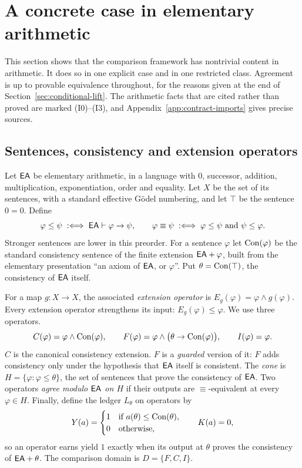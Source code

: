 \section{A concrete case in elementary arithmetic}\label{sec:arithmetic-instance}

This section shows that the comparison framework has nontrivial content in arithmetic. It does so in one explicit case and in one restricted class. Agreement is up to provable equivalence throughout, for the reasons given at the end of Section~\ref{sec:conditional-lift}. The arithmetic facts that are cited rather than proved are marked (I0)--(I3), and Appendix~\ref{app:contract-imports} gives precise sources.

\subsection{Sentences, consistency and extension operators}

Let $\mathsf{EA}$ be elementary arithmetic, in a language with $0$, successor, addition, multiplication, exponentiation, order and equality. Let $X$ be the set of its sentences, with a standard effective G\"odel numbering, and let $\top$ be the sentence $0=0$. Define
\[
\varphi\le\psi \;:\Longleftrightarrow\; \mathsf{EA}\vdash\varphi\to\psi,
\qquad
\varphi\equiv\psi \;:\Longleftrightarrow\; \varphi\le\psi\text{ and }\psi\le\varphi .
\]
Stronger sentences are lower in this preorder. For a sentence $\varphi$ let $\mathrm{Con}(\varphi)$ be the standard consistency sentence of the finite extension $\mathsf{EA}+\varphi$, built from the elementary presentation ``an axiom of $\mathsf{EA}$, or $\varphi$''. Put $\theta=\mathrm{Con}(\top)$, the consistency of $\mathsf{EA}$ itself.

For a map $g\colon X\to X$, the associated \emph{extension operator} is $E_g(\varphi)=\varphi\wedge g(\varphi)$. Every extension operator strengthens its input: $E_g(\varphi)\le\varphi$. We use three operators.
\[
C(\varphi)=\varphi\wedge\mathrm{Con}(\varphi),\qquad
F(\varphi)=\varphi\wedge\bigl(\theta\to\mathrm{Con}(\varphi)\bigr),\qquad
I(\varphi)=\varphi .
\]
$C$ is the canonical consistency extension. $F$ is a \emph{guarded} version of it: $F$ adds consistency only under the hypothesis that $\mathsf{EA}$ itself is consistent. The \emph{cone} is $H=\{\varphi:\varphi\le\theta\}$, the set of sentences that prove the consistency of $\mathsf{EA}$. Two operators \emph{agree modulo $\mathsf{EA}$ on $H$} if their outputs are $\equiv$-equivalent at every $\varphi\in H$. Finally, define the ledger $L_\theta$ on operators by
\[
Y(a)=\begin{cases}1 & \text{if } a(\theta)\le\mathrm{Con}(\theta),\\ 0&\text{otherwise,}\end{cases}\qquad K(a)=0,
\]
so an operator earns yield $1$ exactly when its output at $\theta$ proves the consistency of $\mathsf{EA}+\theta$. The comparison domain is $D=\{F,C,I\}$.


